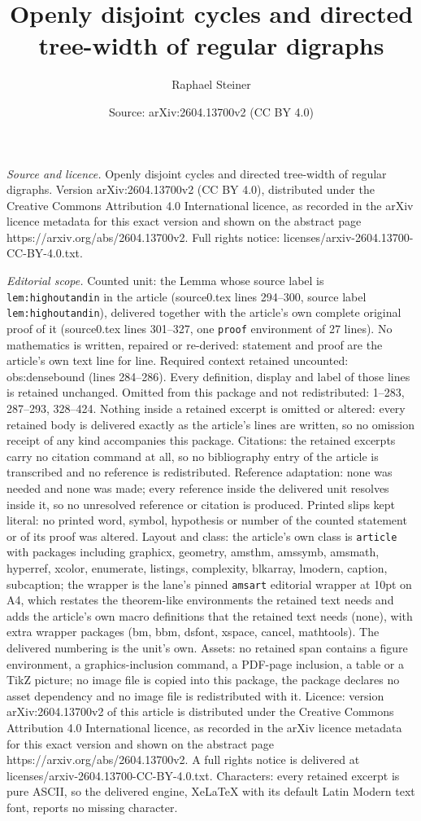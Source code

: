 \documentclass[10pt,a4paper]{amsart}
\title[Openly disjoint cycles and directed tree-width of regular di]{Openly disjoint cycles and directed tree-width of regular digraphs}
\author{Raphael Steiner}
\date{Source: arXiv:2604.13700v2 (CC BY 4.0)}
\begin{document}
\maketitle

\noindent\emph{Source and licence.} Openly disjoint cycles and directed tree-width of regular digraphs. Version arXiv:2604.13700v2 (CC BY 4.0), distributed under the Creative Commons Attribution 4.0 International licence, as recorded in the arXiv licence metadata for this exact version and shown on the abstract page https://arxiv.org/abs/2604.13700v2. Full rights notice: licenses/arxiv-2604.13700-CC-BY-4.0.txt.\par\smallskip

\noindent\textit{Editorial scope.} Counted unit: the Lemma whose source label is \texttt{lem:highoutandin} in the article (source0.tex lines 294--300, source label \texttt{lem:highoutandin}), delivered together with the article's own complete original proof of it (source0.tex lines 301--327, one \texttt{proof} environment of 27 lines). No mathematics is written, repaired or re-derived: statement and proof are the article's own text line for line. Required context retained uncounted: obs:densebound (lines 284--286). Every definition, display and label of those lines is retained unchanged. Omitted from this package and not redistributed: 1--283, 287--293, 328--424. Nothing inside a retained excerpt is omitted or altered: every retained body is delivered exactly as the article's lines are written, so no omission receipt of any kind accompanies this package. Citations: the retained excerpts carry no citation command at all, so no bibliography entry of the article is transcribed and no reference is redistributed. Reference adaptation: none was needed and none was made; every reference inside the delivered unit resolves inside it, so no unresolved reference or citation is produced. Printed slips kept literal: no printed word, symbol, hypothesis or number of the counted statement or of its proof was altered. Layout and class: the article's own class is \texttt{article} with packages including graphicx, geometry, amsthm, amssymb, amsmath, hyperref, xcolor, enumerate, listings, complexity, blkarray, lmodern, caption, subcaption; the wrapper is the lane's pinned \texttt{amsart} editorial wrapper at 10pt on A4, which restates the theorem-like environments the retained text needs and adds the article's own macro definitions that the retained text needs (none), with extra wrapper packages (bm, bbm, dsfont, xspace, cancel, mathtools). The delivered numbering is the unit's own. Assets: no retained span contains a figure environment, a graphics-inclusion command, a PDF-page inclusion, a table or a TikZ picture; no image file is copied into this package, the package declares no asset dependency and no image file is redistributed with it. Licence: version arXiv:2604.13700v2 of this article is distributed under the Creative Commons Attribution 4.0 International licence, as recorded in the arXiv licence metadata for this exact version and shown on the abstract page https://arxiv.org/abs/2604.13700v2. A full rights notice is delivered at licenses/arxiv-2604.13700-CC-BY-4.0.txt. Characters: every retained excerpt is pure ASCII, so the delivered engine, XeLaTeX with its default Latin Modern text font, reports no missing character.
\end{document}
